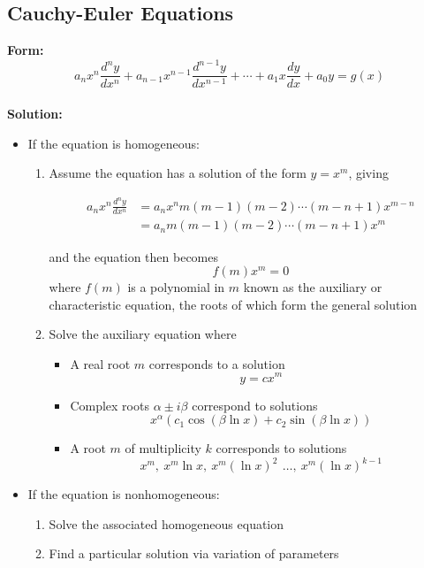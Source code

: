 \documentclass{article}
\begin{document}
\subsection{Cauchy-Euler Equations}

\textbf{Form:} \[a_n x^n \frac{d^n y}{dx^n} + a_{n - 1} x^{n - 1} \frac{d^{n - 1} y}{dx^{n - 1}} + \cdots + a_1 x \frac{dy}{dx} + a_0 y = g(x)\] \\ \textbf{Solution:} \begin{itemize}
  \item If the equation is homogeneous:

        \begin{enumerate}
          \item Assume the equation has a solution of the form $y = x^m$, giving

                \begin{align*}
                  a_n x^n \frac{d^n y}{dx^n} & = a_n x^n m (m - 1) (m - 2) \cdots (m - n + 1) x^{m - n} \\
                                             & = a_n m (m - 1) (m - 2) \cdots (m - n + 1) x^m
                \end{align*}

                and the equation then becomes \[f(m) x^m = 0\] where $f(m)$ is a polynomial in $m$ known as the auxiliary or characteristic equation, the roots of which form the general solution

          \item Solve the auxiliary equation where

                \begin{itemize}
                  \item A real root $m$ corresponds to a solution \[y = c x^m\]

                  \item Complex roots $\alpha \pm i \beta$ correspond to solutions \[x^\alpha (c_1 \cos (\beta \ln x) + c_2 \sin (\beta \ln x))\]

                  \item A root $m$ of multiplicity $k$ corresponds to solutions \[x^m, \: x^m \ln x, \: x^m (\ln x)^2\, \:\ldots, \: x^m (\ln x)^{k - 1}\]
                \end{itemize}
        \end{enumerate}

  \item If the equation is nonhomogeneous:

        \begin{enumerate}
          \item Solve the associated homogeneous equation

          \item Find a particular solution via variation of parameters
        \end{enumerate}
\end{itemize}
\end{document}
